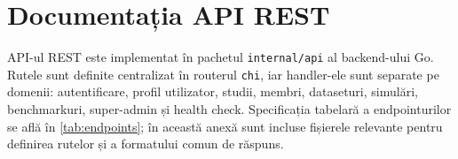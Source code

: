 \chapter{Documentația API REST}
\label{app:api_rest}

API-ul REST este implementat în pachetul \texttt{internal/api} al backend-ului Go.
Rutele sunt definite centralizat în routerul \texttt{chi}, iar handler-ele sunt
separate pe domenii: autentificare, profil utilizator, studii, membri,
dataseturi, simulări, benchmarkuri, super-admin și health check. Specificația
tabelară a endpointurilor se află în
\cref{tab:endpoints}; în această anexă sunt incluse fișierele relevante pentru
definirea rutelor și a formatului comun de răspuns.






